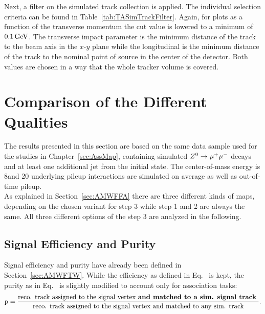 

Next, a filter on the simulated track collection is applied. The individual selection criteria can be found in Table~\ref{tab:TASimTrackFilter}. Again, for plots as a function of the transverse momentum the cut value is lowered to a minimum \pt{} of $0.1\,\text{Ge\hspace{-.08em}V}$. The transverse impact parameter is the minimum distance of the track to the beam axis in the $x$-$y$ plane while the longitudinal is the minimum distance of the track to the nominal point of source in the center of the detector. Both values are chosen in a way that the whole tracker volume is covered.



\section{Comparison of the Different Qualities \label{sec:TASEFRDQ}}

The results presented in this section are based on the same data sample used for the studies in Chapter~\ref{sec:AssMap}, containing simulated ${Z^{0}}\rightarrow\mu^+\mu^-$ decays and at least one additional jet from the initial state. The center-of-mass energy is 8\TeV and 20 underlying pileup interactions are simulated on average as well as out-of-time pileup. \\
As explained in Section~\ref{sec:AMWFFA} there are three different kinds of maps, depending on the chosen variant for step 3 while step 1 and 2 are always the same. All three different options of the step 3 are analyzed in the following.

\subsection{Signal Efficiency and Purity \label{sec:TASEFR}}

Signal efficiency and purity have already been defined in Section~\ref{sec:AMWFTW}. While the efficiency as defined in Eq.~ is kept, the purity as in Eq.~ is slightly modified to account only for association tasks:
\begin{equation}
    \textrm{p} = \frac{ \textrm{reco. track assigned to the signal vertex \textbf{and matched to a sim. signal track} } }{ \textrm{reco. track assigned to the signal vertex and matched to any sim. track} }.
    \label{eq:AssPurity}
\end{equation}

